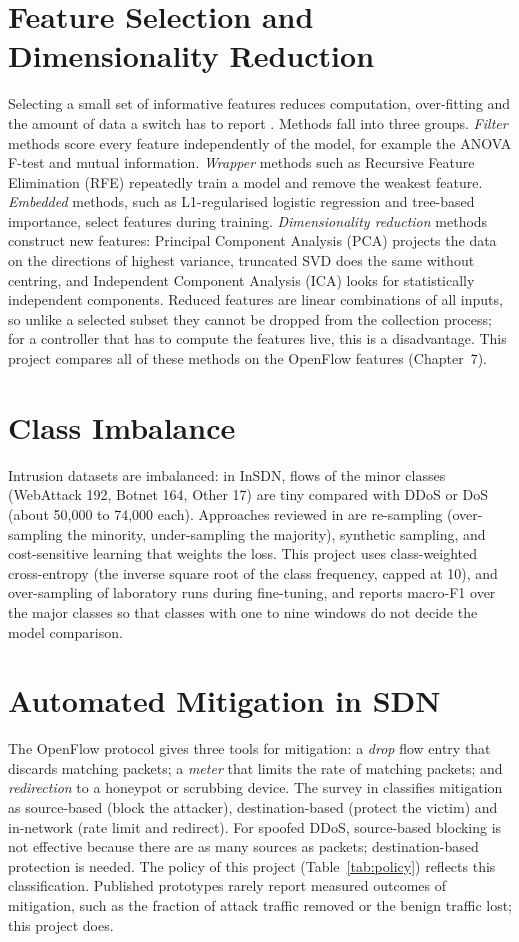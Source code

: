 \section{Feature Selection and Dimensionality Reduction}
Selecting a small set of informative features reduces computation, over-fitting and the amount of data a switch has to report \cite{bib:guyon}. Methods fall into three groups. \emph{Filter} methods score every feature independently of the model, for example the ANOVA F-test and mutual information. \emph{Wrapper} methods such as Recursive Feature Elimination (RFE) repeatedly train a model and remove the weakest feature. \emph{Embedded} methods, such as L1-regularised logistic regression and tree-based importance, select features during training. \emph{Dimensionality reduction} methods construct new features: Principal Component Analysis (PCA) \cite{bib:pca} projects the data on the directions of highest variance, truncated SVD does the same without centring, and Independent Component Analysis (ICA) \cite{bib:ica} looks for statistically independent components. Reduced features are linear combinations of all inputs, so unlike a selected subset they cannot be dropped from the collection process; for a controller that has to compute the features live, this is a disadvantage. This project compares all of these methods on the OpenFlow features (Chapter~7).

\section{Class Imbalance}
Intrusion datasets are imbalanced: in InSDN, flows of the minor classes (WebAttack 192, Botnet 164, Other 17) are tiny compared with DDoS or DoS (about 50,000 to 74,000 each). Approaches reviewed in \cite{bib:imbalance} are re-sampling (over-sampling the minority, under-sampling the majority), synthetic sampling, and cost-sensitive learning that weights the loss. This project uses class-weighted cross-entropy (the inverse square root of the class frequency, capped at 10), and over-sampling of laboratory runs during fine-tuning, and reports macro-F1 over the major classes so that classes with one to nine windows do not decide the model comparison.

\section{Automated Mitigation in SDN}
The OpenFlow protocol gives three tools for mitigation: a \emph{drop} flow entry that discards matching packets; a \emph{meter} that limits the rate of matching packets; and \emph{redirection} to a honeypot or scrubbing device. The survey in \cite{bib:yan} classifies mitigation as source-based (block the attacker), destination-based (protect the victim) and in-network (rate limit and redirect). For spoofed DDoS, source-based blocking is not effective because there are as many sources as packets; destination-based protection is needed. The policy of this project (Table~\ref{tab:policy}) reflects this classification. Published prototypes rarely report measured outcomes of mitigation, such as the fraction of attack traffic removed or the benign traffic lost; this project does.


